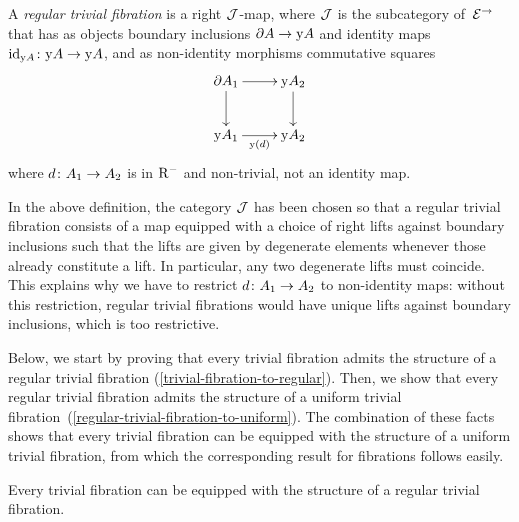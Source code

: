 \documentclass[reqno,10pt,a4paper,oneside,draft]{amsart}
\begin{document}
\begin{definition}
A \emph{regular trivial fibration} is a right $\cal{J}$-map, where $\cal{J}$ is the subcategory of~$\catE^{\to}$ that has as objects boundary inclusions $\partial A \to \yon A$ and identity maps $\id_{\yon A} \co \yon A \to \yon A$, and as non-identity morphisms commutative squares
\[
\xymatrix{
  \partial A_1
  \ar[r]
  \ar[d]
&
  \yon A_2
  \ar[d]
\\
  \yon A_1
  \ar[r]_{\yon(d)}
&
  \yon A_2
}
\]
where $d \co A_1 \to A_2$ is in $\Rm$ and non-trivial, \ie not an identity map.
\end{definition}

In the above definition, the category $\cal{J}$ has been chosen so that a regular trivial fibration consists of a map equipped with a choice of right lifts against boundary inclusions such that the lifts are given by degenerate elements whenever those already constitute a lift.
In particular, any two degenerate lifts must coincide.
This explains why we have to restrict $d \co A_1 \to A_2$ to non-identity maps: without this restriction, regular trivial fibrations would have unique lifts against boundary inclusions, which is too restrictive.

Below, we start by proving that every trivial fibration admits the structure of a regular trivial fibration (\cref{trivial-fibration-to-regular}).
Then, we show that every regular trivial fibration admits the structure of a uniform trivial fibration~(\cref{regular-trivial-fibration-to-uniform}).
The combination of these facts shows that every trivial fibration can be equipped with the structure of a uniform trivial fibration, from which the corresponding result for fibrations follows easily.

\begin{proposition} \label{trivial-fibration-to-regular}
Every trivial fibration can be equipped with the structure of a regular trivial fibration.
\end{proposition}
\end{document}
